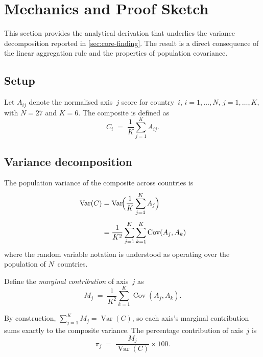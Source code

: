 \section{Mechanics and Proof Sketch}\label{sec:proof}

This section provides the analytical derivation that underlies the
variance decomposition reported in \cref{sec:core-finding}.  The
result is a direct consequence of the linear aggregation rule and the
properties of population covariance.

\subsection{Setup}

Let $A_{ij}$ denote the normalised axis~$j$ score for country~$i$,
$i = 1, \ldots, N$, $j = 1, \ldots, K$, with $N = 27$ and $K = 6$.
The composite is defined as
\begin{equation}\label{eq:composite-def}
  C_i
  \;=\;
  \frac{1}{K} \sum_{j=1}^{K} A_{ij}.
\end{equation}

\subsection{Variance decomposition}

The population variance of the composite across countries is
\begin{align}
  \operatorname{Var}(C)
  &= \operatorname{Var}\!\Bigl(\frac{1}{K}\sum_{j=1}^{K} A_j\Bigr)
  \notag \\[4pt]
  &= \frac{1}{K^2} \sum_{j=1}^{K} \sum_{k=1}^{K}
     \operatorname{Cov}(A_j, A_k)
  \label{eq:var-decomp}
\end{align}
where the random variable notation is understood as operating over
the population of $N$~countries.

Define the \emph{marginal contribution} of axis~$j$ as
\begin{equation}\label{eq:marginal}
  M_j
  \;=\;
  \frac{1}{K^2} \sum_{k=1}^{K} \operatorname{Cov}(A_j, A_k).
\end{equation}

By construction, $\sum_{j=1}^{K} M_j = \operatorname{Var}(C)$, so
each axis's marginal contribution sums exactly to the composite
variance.  The percentage contribution of axis~$j$ is
\begin{equation}\label{eq:pct-contrib}
  \pi_j
  \;=\;
  \frac{M_j}{\operatorname{Var}(C)} \times 100.
\end{equation}

